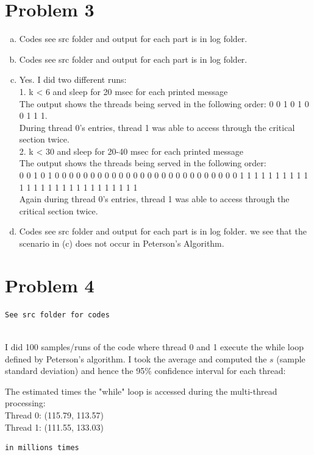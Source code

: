 \documentclass{article}   	                         %
\begin{document}
\section*{Problem 3}
\begin{enumerate}[(a)]
\item Codes see src folder and output for each part is in log folder.\\
\item Codes see src folder and output for each part is in log folder.\\
\item Yes. I did two different runs:\\
1. k < 6 and sleep for 20 msec for each printed message\\
The output shows the threads being served in the following order:
0 0 1 0 1 0 0 1 1 1.\\
During thread 0's entries, thread 1 was able to access through the critical section twice.\\
2. k < 30 and sleep for 20-40 msec for each printed message\\
The output shows the threads being served in the following order:\\
0 0 1 0 1 0 0 0 0 0 0 0 0 0 0 0 0 0 0 0 0 0 0 0 0 0 0 0 0 0 0 1 1 1 1 1 1 1 1 1 1 1 1 1 1 1 1 1 1 1 1 1 1 1 1 1 1 1\\
Again during thread 0's entries, thread 1 was able to access through the critical section twice.\\
\item
Codes see src folder and output for each part is in log folder. we see that the scenario in (c) does not occur in Peterson's Algorithm.\\
\end{enumerate}
\section*{Problem 4}
\begin{BVerbatim}
See src folder for codes
\end{BVerbatim}
\\
I did 100 samples/runs of the code where thread 0 and 1 execute the while loop defined by Peterson's algorithm. I took the average and computed the $s$ (sample standard deviation) and hence the 95$\%$ confidence interval for each thread:\\
\begin{center}
The estimated times the "while" loop is accessed during the multi-thread processing:\\
Thread 0: (115.79, 113.57)\\
Thread 1: (111.55, 133.03)\\

\begin{BVerbatim}
in millions times
\end{BVerbatim} 
\end{center}
\end{document}
